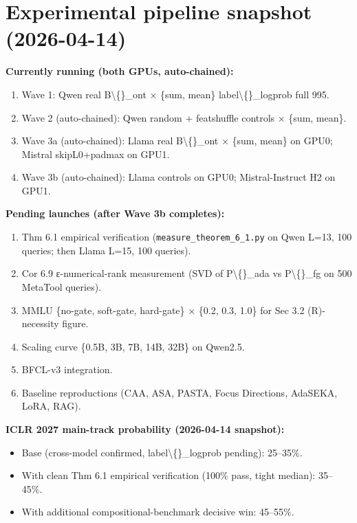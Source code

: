 \section{Experimental pipeline snapshot (2026-04-14)}
\textbf{Currently running (both GPUs, auto-chained):}


\begin{enumerate}
\item Wave 1: Qwen real B\textbackslash\{\}\_ont × \{sum, mean\} label\textbackslash\{\}\_logprob full 995.
\item Wave 2 (auto-chained): Qwen random + featshuffle controls × \{sum, mean\}.
\item Wave 3a (auto-chained): Llama real B\textbackslash\{\}\_ont × \{sum, mean\} on GPU0; Mistral skipL0+padmax on GPU1.
\item Wave 3b (auto-chained): Llama controls on GPU0; Mistral-Instruct H2 on GPU1.
\end{enumerate}

\textbf{Pending launches (after Wave 3b completes):}


\begin{enumerate}
\item Thm 6.1 empirical verification (\texttt{measure\_theorem\_6\_1.py} on Qwen L=13, 100 queries; then Llama L=15, 100 queries).
\item Cor 6.9 ε-numerical-rank measurement (SVD of P\textbackslash\{\}\_ada vs P\textbackslash\{\}\_fg on 500 MetaTool queries).
\item MMLU \{no-gate, soft-gate, hard-gate\} × \{0.2, 0.3, 1.0\} for Sec 3.2 (R)-necessity figure.
\item Scaling curve \{0.5B, 3B, 7B, 14B, 32B\} on Qwen2.5.
\item BFCL-v3 integration.
\item Baseline reproductions (CAA, ASA, PASTA, Focus Directions, AdaSEKA, LoRA, RAG).
\end{enumerate}

\textbf{ICLR 2027 main-track probability (2026-04-14 snapshot):}


\begin{itemize}
\item Base (cross-model confirmed, label\textbackslash\{\}\_logprob pending): 25–35\%.
\item With clean Thm 6.1 empirical verification (100\% pass, tight median): 35–45\%.
\item With additional compositional-benchmark decisive win: 45–55\%.
\end{itemize}
